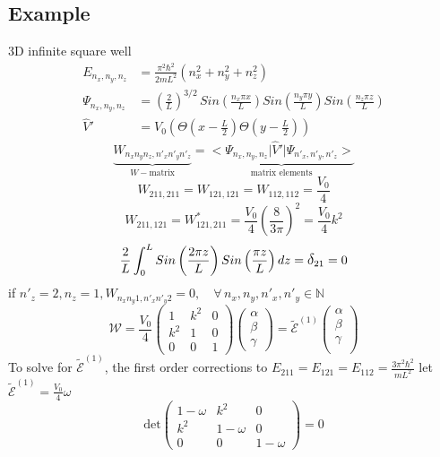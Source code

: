 \documentclass[12pt,fancychapters]{report}
\numberwithin{equation}{section}
\begin{document}
\subsection*{Example}
3D infinite square well
\begin{align*}
  E_{n_x,n_y,n_z} &= \frac{\pi^2 \hbar^2}{2mL^2}\left(n_x^2+n_y^2+n_z^2 \right)\\
  \Psi_{n_x,n_y,n_z} &= \left(\frac{2}{L}\right)^{3/2}\,Sin\left(\frac{n_x \pi x}{L}\right)
  Sin\left(\frac{n_y \pi y}{L}\right)Sin\left(\frac{n_z \pi z}{L}\right) \\
  \hat{V}'&= V_0\left(\Theta\left(x-\frac{L}{2}\right) \Theta\left(y-\frac{L}{2}\right) \right)
\end{align*}
\[
  \underbrace{W_{n_xn_yn_z,n'_xn'_yn'_z}}_{W-\text{matrix}} =\underbrace{\big< \Psi_{n_x,n_y,n_z}
  \big|\hat{V}'\big|
\Psi_{n'_x,n'_y,n'_z} \big>}_{\text{matrix elements}}
\]
\[
  W_{211,211} = W_{121,121} = W_{112,112} = \frac{V_0}{4} 
\]
\[
  W_{211,121} = W_{121,211}^* = \frac{V_0}{4}\left(\frac{8}{3\pi}\right)^2 = \frac{V_0}{4}k^2
\]
\[
  \frac{2}{L}\int_{0}^{L}Sin\left(\frac{2\pi z}{L}\right)Sin\left(\frac{\pi z}{L}\right)dz =
  \mathlarger{\delta}_{21}=0
\]
if $n'_z = 2, n_z = 1, W_{n_xn_y1,n'_xn'_y2} = 0, \quad \forall\, n_x,n_y,n'_x,n'_y \in \mathbb{N}$
\begin{equation}
  \mathcal{W}=
 \frac{V_0}{4}
  \begin{pmatrix}
    1 & k^2 & 0\\
    k^2 & 1 & 0\\
    0 & 0 & 1
  \end{pmatrix}
  \begin{pmatrix}
    \alpha\\
    \beta\\
    \gamma
  \end{pmatrix} = \tilde{\mathcal{E}}^{(1)}
  \begin{pmatrix}
    \alpha\\
    \beta\\
    \gamma\\
  \end{pmatrix}
\end{equation}
To solve for $\tilde{\mathcal{E}}^{(1)}$, the first order corrections to $E_{211} =E_{121}
=E_{112} = \frac{3\pi^2 \hbar^2}{mL^2}$ let $\tilde{\mathcal{E}}^{(1)} = \frac{V_0}{4}\omega$
\[
  \text{det}
  \begin{pmatrix}
  1-\omega & k^2 & 0\\
  k^2 & 1-\omega & 0\\
  0 & 0 & 1-\omega
  \end{pmatrix}
  = 0
\]
\end{document}
